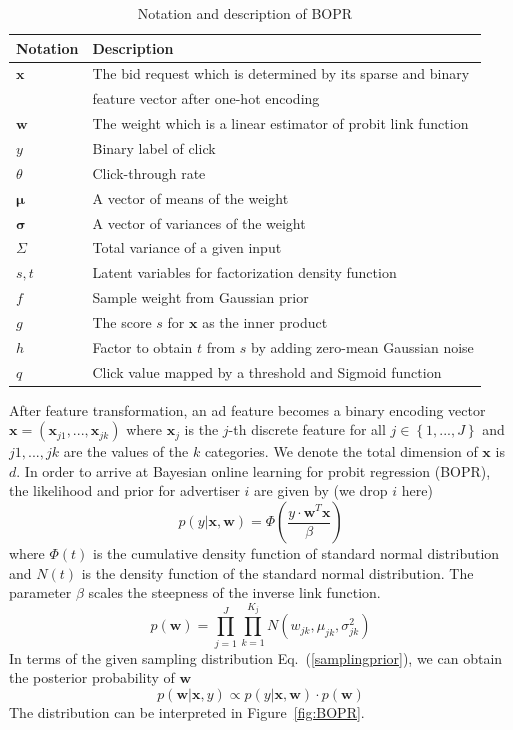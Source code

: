 \begin{table}[H]
\caption{Notation and description of BOPR}
\label{tab:BOPR}
\begin{center}
\begin{tabular}{ l l } 
\hline
Notation & Description \\
\hline
$\mathbf{x}$ & The bid request which is determined by its sparse and binary \\
& feature vector after one-hot encoding\\
$\mathbf{w}$ & The weight which is a linear estimator of probit link function\\
$y$ & Binary label of click \\
$\theta$ & Click-through rate \\
$\bm{\mu }$ & A vector of means of the weight \\
$\bm{\sigma }$ & A vector of variances of the weight \\
$\Sigma$ & Total variance of a given input \\
$s, t$ & Latent variables for factorization density function\\
$f$ & Sample weight from Gaussian prior\\
$g$ & The score $s$ for $\mathbf{x}$ as the inner product\\
$h$ & Factor to obtain $t$ from $s$ by adding zero-mean Gaussian noise \\
$q$ & Click value mapped by a threshold and Sigmoid function \\
\hline
\end{tabular}
\end{center}
\end {table}
After feature transformation, an ad feature becomes a binary encoding vector $\mathbf{x}=(\mathbf{x}_{j1},...,\mathbf{x}_{jk})$ where $\mathbf{x}_{j}$ is the $j$-th discrete feature for all $j\in\left \{ 1,...,J \right \}$ and $j1,...,jk$ are the values of the $k$ categories. We denote the total dimension of $\mathbf{x}$ is $d$. In order to arrive at Bayesian online learning for probit regression (BOPR), the likelihood and prior for advertiser $i$ are given by (we drop $i$ here)
\begin{equation}
\label{samplingprior}
p(y|\mathbf{x},\mathbf{w})=\Phi (\frac{y\cdot \mathbf{w}^{T} \mathbf{x}}{\beta })
\end{equation}
where $\Phi(t)$ is the cumulative density function of standard normal distribution and $N(t)$ is the density function of the standard normal distribution. The parameter $\beta$ scales the steepness of the inverse link function.
\begin{equation}
p(\mathbf{w})=\prod_{j=1}^{J} \prod_{k=1}^{K_j}N(w_{jk},\mu_{jk},\sigma_{jk}^2)
\end{equation}
In terms of the given sampling distribution Eq.~(\ref{samplingprior}), we can obtain the posterior probability of $\mathbf{w}$
\begin{equation}
p(\mathbf{w}|\mathbf{x},y) \propto p(y|\mathbf{x},\mathbf{w}) \cdot p(\mathbf{w})
\end{equation}
The distribution can be interpreted in Figure~\ref{fig:BOPR}.

